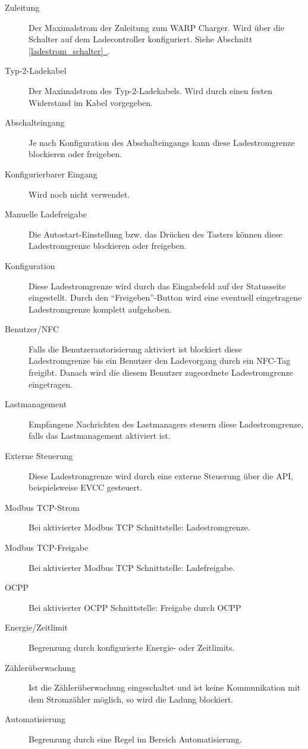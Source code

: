 \documentclass[a4paper,10pt]{article}
\newcommand*{\fullref}[1]{\hyperref[{#1}]{\ref*{#1}~\nameref*{#1}}}
\begin{document}
\begin{multicols*}{2}
	\begin{description}
		\item[Zuleitung] Der Maximalstrom der Zuleitung zum WARP Charger.
			Wird über die Schalter auf dem Ladecontroller konfiguriert. Siehe
			Abschnitt \fullref{ladestrom_schalter}.
		\item[Typ-2-Ladekabel] Der Maximalstrom des Typ-2-Ladekabels. Wird durch einen festen Widerstand im Kabel vorgegeben.
		\item[Abschalteingang] Je nach Konfiguration des Abschalteingangs kann diese Ladestromgrenze blockieren oder freigeben.
		\item[Konfigurierbarer Eingang] Wird noch nicht verwendet.
		\item[Manuelle Ladefreigabe] Die Autostart-Einstellung bzw. das Drücken des Tasters können diese Ladestromgrenze blockieren oder freigeben.
		\item[Konfiguration] Diese Ladestromgrenze wird durch das Eingabefeld auf der Statusseite eingestellt.
			Durch den \enquote{Freigeben}-Button wird eine eventuell eingetragene Ladestromgrenze komplett aufgehoben.
		\item[Benutzer/NFC] Falls die Benutzerautorisierung aktiviert ist blockiert diese Ladestromgrenze bis ein Benutzer den Ladevorgang durch ein NFC-Tag freigibt.
			Danach wird die diesem Benutzer zugeordnete Ladestromgrenze eingetragen.
		\item[Lastmanagement] Empfangene Nachrichten des Lastmanagers steuern diese Ladestromgrenze, falls das Lastmanagement aktiviert ist.
		\item[Externe Steuerung] Diese Ladestromgrenze wird durch eine externe Steuerung über die API, beispielsweise EVCC gesteuert.
		\item[Modbus TCP-Strom] Bei aktivierter Modbus TCP Schnittstelle: \glqq	Ladestromgrenze\grqq.
		\item[Modbus TCP-Freigabe] Bei aktivierter Modbus TCP Schnittstelle: \glqq Ladefreigabe\grqq.
		\item[OCPP] Bei aktivierter OCPP Schnittstelle: Freigabe durch OCPP
		\item[Energie/Zeitlimit] Begrenzung durch konfigurierte Energie- oder Zeitlimits.
		\item[Zählerüberwachung] Ist die Zählerüberwachung eingeschaltet und ist keine Kommunikation mit dem Stromzähler möglich, so wird die Ladung blockiert.
		\item[Automatisierung] Begrenzung durch eine Regel im Bereich \glqq Automatisierung\grqq.
	\end{description}



\end{multicols*}
\end{document}

